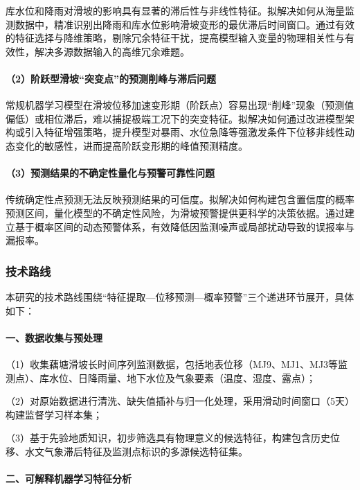 \documentclass[12pt,a4paper]{article}
\begin{document}
库水位和降雨对滑坡的影响具有显著的滞后性与非线性特征。拟解决如何从海量监测数据中，精准识别出降雨和库水位影响滑坡变形的最优滞后时间窗口。通过有效的特征选择与降维策略，剔除冗余特征干扰，提高模型输入变量的物理相关性与有效性，解决多源数据输入的高维冗余难题。

\paragraph{（2）阶跃型滑坡“突变点”的预测削峰与滞后问题}

常规机器学习模型在滑坡位移加速变形期（阶跃点）容易出现“削峰”现象（预测值偏低）或相位滞后，难以捕捉极端工况下的突变特征。拟解决如何通过改进模型架构或引入特征增强策略，提升模型对暴雨、水位急降等强激发条件下位移非线性动态变化的敏感性，进而提高阶跃变形期的峰值预测精度。

\paragraph{（3）预测结果的不确定性量化与预警可靠性问题}

传统确定性点预测无法反映预测结果的可信度。拟解决如何构建包含置信度的概率预测区间，量化模型的不确定性风险，为滑坡预警提供更科学的决策依据。通过建立基于概率区间的动态预警体系，有效降低因监测噪声或局部扰动导致的误报率与漏报率。

\subsubsection{技术路线}

本研究的技术路线围绕“特征提取—位移预测—概率预警”三个递进环节展开，具体如下：

\paragraph{一、数据收集与预处理}

    （1）收集藕塘滑坡长时间序列监测数据，包括地表位移（MJ9、MJ1、MJ3等监测点）、库水位、日降雨量、地下水位及气象要素（温度、湿度、露点）；

    （2）对原始数据进行清洗、缺失值插补与归一化处理，采用滑动时间窗口（5天）构建监督学习样本集；

    （3）基于先验地质知识，初步筛选具有物理意义的候选特征，构建包含历史位移、水文气象滞后特征及监测点标识的多源候选特征集。

\paragraph{二、可解释机器学习特征分析}
\end{document}
